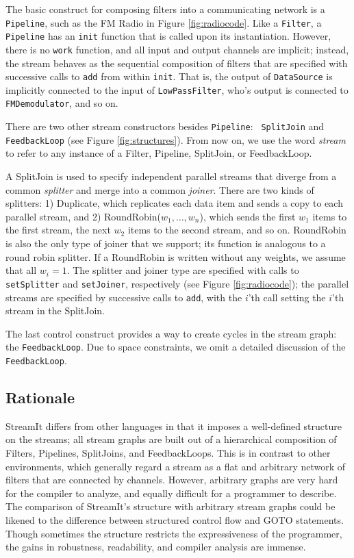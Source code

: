 The basic construct for composing filters into a communicating network
is a {\tt Pipeline}, such as the FM Radio in Figure
\ref{fig:radiocode}.  Like a {\tt Filter}, a {\tt Pipeline} has an
{\tt init} function that is called upon its instantiation.  However,
there is no {\tt work} function, and all input and output channels are
implicit; instead, the stream behaves as the sequential composition of
filters that are specified with successive calls to {\tt add} from
within {\tt init}.  That is, the output of {\tt DataSource} is
implicitly connected to the input of {\tt LowPassFilter}, who's output
is connected to {\tt FMDemodulator}, and so on.

There are two other stream constructors besides {\tt Pipeline}: {\tt
SplitJoin} and {\tt FeedbackLoop} (see Figure \ref{fig:structures}).
From now on, we use the word {\it stream} to refer to any instance of
a Filter, Pipeline, SplitJoin, or FeedbackLoop.

A SplitJoin is used to specify independent parallel streams that
diverge from a common {\it splitter} and merge into a common {\it
joiner}.  There are two kinds of splitters: 1) Duplicate, which
replicates each data item and sends a copy to each parallel stream,
and 2) RoundRobin($w_1, \dots, w_n$), which sends the first $w_1$
items to the first stream, the next $w_2$ items to the second stream,
and so on.  RoundRobin is also the only type of joiner that we
support; its function is analogous to a round robin splitter.  If a
RoundRobin is written without any weights, we assume that all $w_i =
1$.  The splitter and joiner type are specified with calls to {\tt
setSplitter} and {\tt setJoiner}, respectively (see Figure
\ref{fig:radiocode}); the parallel streams are specified by successive
calls to {\tt add}, with the $i$'th call setting the $i$'th stream in
the SplitJoin.

The last control construct provides a way to create cycles in the
stream graph: the {\tt FeedbackLoop}.  Due to space constraints, we
omit a detailed discussion of the {\tt FeedbackLoop}.

\subsection{Rationale}

StreamIt differs from other languages in that it imposes a
well-defined structure on the streams; all stream graphs are built out
of a hierarchical composition of Filters, Pipelines, SplitJoins, and
FeedbackLoops.  This is in contrast to other environments, which
generally regard a stream as a flat and arbitrary network of filters
that are connected by channels.  However, arbitrary graphs are very
hard for the compiler to analyze, and equally difficult for a
programmer to describe.  The comparison of StreamIt's structure with
arbitrary stream graphs could be likened to the difference between
structured control flow and GOTO statements.  Though sometimes the
structure restricts the expressiveness of the programmer, the gains in
robustness, readability, and compiler analysis are immense.

